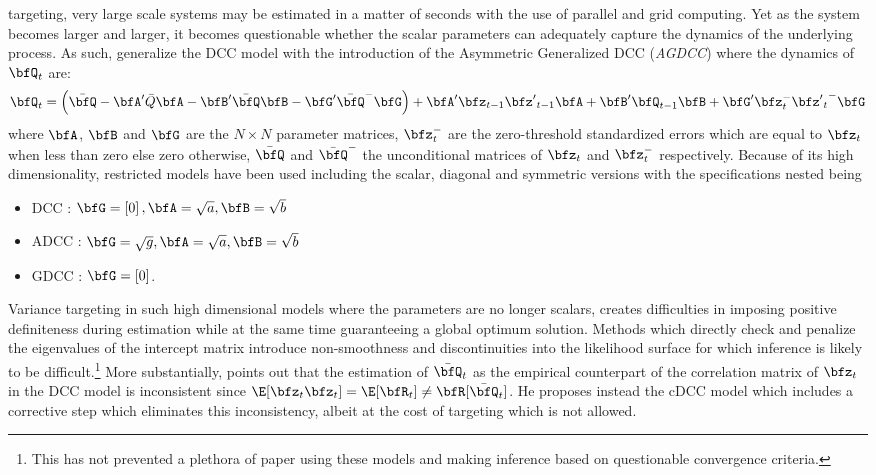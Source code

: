 targeting, very large scale systems may be estimated in a matter of seconds with
the use of parallel and grid computing. Yet as the system becomes larger and
larger, it becomes questionable whether the scalar parameters can adequately
capture the dynamics of the underlying process. As such, \cite{Cappiello2006}
generalize the DCC model with the introduction of the Asymmetric Generalized
DCC (\emph{AGDCC}) where the dynamics of $\bfQ_t$ are:
\begin{equation}\label{eq:agdcc1}
{\bfQ_t} = \left( {\bar \bfQ - \bfA'\bar Q\bfA - \bfB'\bar \bfQ\bfB - \bfG'{{\bar \bfQ}^ - }\bfG} \right) + \bfA'{\bfz_{t - 1}}{{\bfz'}_{t - 1}}\bfA + \bfB'{\bfQ_{t - 1}}\bfB + \bfG'\bfz_t^ - {{\bfz'}_t}^ - \bfG
\end{equation}
where $\bfA$, $\bfB$ and $\bfG$ are the $N\times N$ parameter matrices,
$\bfz_t^ -$ are the zero-threshold standardized errors which are equal
to $\bfz_t$ when less than zero else zero otherwise, $\bar \bfQ$ and $\bar \bfQ^ -$
the unconditional matrices of $\bfz_t$ and $\bfz_t^-$ respectively. Because of
its high dimensionality, restricted models have been used including the scalar,
diagonal and symmetric versions with the specifications nested being
\begin{itemize}
\item  DCC : $\bfG = \left[ 0 \right],\bfA = \sqrt a ,\bfB = \sqrt b$
\item ADCC : $\bfG = \sqrt g ,\bfA = \sqrt a ,\bfB = \sqrt b$
\item GDCC : $\bfG = \left[ 0 \right]$.
\end{itemize}
Variance targeting in such high dimensional models where the parameters are no
longer scalars, creates difficulties in imposing positive definiteness during
estimation while at the same time guaranteeing a global optimum solution. Methods
which directly check and penalize the eigenvalues of the intercept matrix introduce
non-smoothness and discontinuities into the likelihood surface for which inference
is likely to be difficult.\footnote{This has not prevented a plethora of paper
using these models and making inference based on questionable convergence
criteria.} More substantially, \cite{Aielli2009} points out that the
estimation of $\bar \bfQ_t$ as the empirical counterpart of the correlation
matrix of $\bfz_t$ in the DCC model is inconsistent since $\E[\bfz_t \bfz_t]=\E[\bfR_t]\neq \bfR[\bar \bfQ_t]$.
He proposes instead the cDCC model which includes a corrective step which eliminates
this inconsistency, albeit at the cost of targeting which is not allowed.\\

